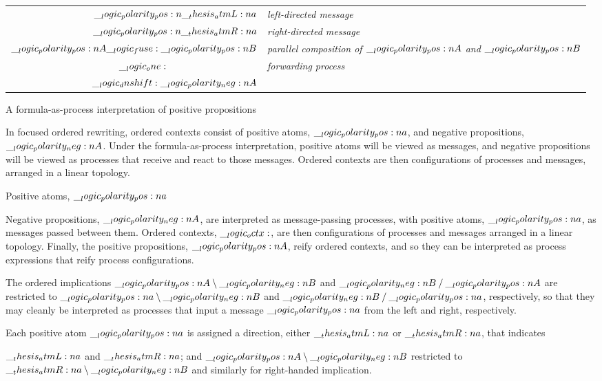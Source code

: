 \begin{margintable}
  \begin{center}
    \begin{tabular}{@{}r@{\enspace}>{\itshape}l@{}}
      $\__logic_polarity_pos:n {\__thesis_atmL:n {a}}$ & left-directed message \\
      $\__logic_polarity_pos:n {\__thesis_atmR:n {a}}$ & right-directed message \\
      $\__logic_polarity_pos:n {A} \__logic_fuse: \__logic_polarity_pos:n {B}$ & parallel composition of $\__logic_polarity_pos:n {A}$ and $\__logic_polarity_pos:n {B}$ \\
      $\one\hphantom{\p{}}$ & forwarding process \\
      $\__logic_dnshift: \__logic_polarity_neg:n {A}$ & 
    \end{tabular}
  \end{center}
  \caption{A formula-as-process interpretation of positive propositions}\label{fig:choreographies:posprop-table}
\end{margintable}

In focused ordered rewriting, ordered contexts consist of positive atoms, $\__logic_polarity_pos:n {a}$, and negative propositions, $\__logic_polarity_neg:n {A}$.
Under the formula-as-process interpretation, positive atoms will be viewed as messages, and negative propositions will be viewed as processes that receive and react to those messages.
Ordered contexts are then configurations of processes and messages, arranged in a linear topology.





Positive atoms, $\__logic_polarity_pos:n {a}$


Negative propositions, $\__logic_polarity_neg:n {A}$, are interpreted as message-passing processes, with positive atoms, $\__logic_polarity_pos:n {a}$, as messages passed between them.
Ordered contexts, $\__logic_octx:$, are then configurations of processes and messages arranged in a linear topology.
Finally, the positive propositions, $\__logic_polarity_pos:n {A}$, reify ordered contexts, and so they can be interpreted as process expressions that reify process configurations.

The ordered implications $\__logic_polarity_pos:n {A} \mathbin { \setminus } \__logic_polarity_neg:n {B}$ and $\__logic_polarity_neg:n {B} \mathbin { / } \__logic_polarity_pos:n {A}$ are restricted to $\__logic_polarity_pos:n {a} \mathbin { \setminus } \__logic_polarity_neg:n {B}$ and $\__logic_polarity_neg:n {B} \mathbin { / } \__logic_polarity_pos:n {a}$, respectively, so that they may cleanly be interpreted as processes that input a message $\__logic_polarity_pos:n {a}$ from the left and right, respectively.


Each positive atom $\__logic_polarity_pos:n {a}$ is assigned a direction, either $\__thesis_atmL:n {a}$ or $\__thesis_atmR:n {a}$, that indicates 

$\__thesis_atmL:n {a}$ and $\__thesis_atmR:n {a}$; and $\__logic_polarity_pos:n {A} \mathbin { \setminus } \__logic_polarity_neg:n {B}$ restricted to $\__thesis_atmR:n {a} \mathbin { \setminus } \__logic_polarity_neg:n {B}$ and similarly for right-handed implication.


